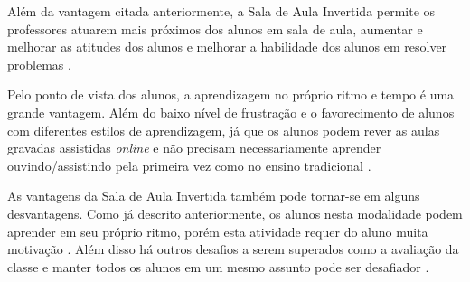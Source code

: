 Além da vantagem citada anteriormente, a Sala de Aula Invertida permite os professores atuarem mais próximos dos alunos em sala de aula, aumentar e melhorar as atitudes dos alunos e melhorar a habilidade dos alunos em resolver problemas \cite{fulton_10_2012}. 

Pelo ponto de vista dos alunos, a aprendizagem no próprio ritmo e tempo é uma grande vantagem. Além do baixo nível de frustração e o favorecimento de alunos com diferentes estilos de aprendizagem, já que os alunos podem rever as aulas gravadas assistidas \emph{online} e não precisam necessariamente aprender ouvindo/assistindo pela primeira vez como no ensino tradicional \cite{fulton_10_2012}.

As vantagens da Sala de Aula Invertida também pode tornar-se em alguns desvantagens. Como já descrito anteriormente, os alunos nesta modalidade podem aprender em seu próprio ritmo, porém esta atividade requer do aluno muita motivação \cite{du_flipped_2014}. Além disso há outros desafios a serem superados como a avaliação da classe e manter todos os alunos em um mesmo assunto pode ser desafiador \cite{du_flipped_2014}.







